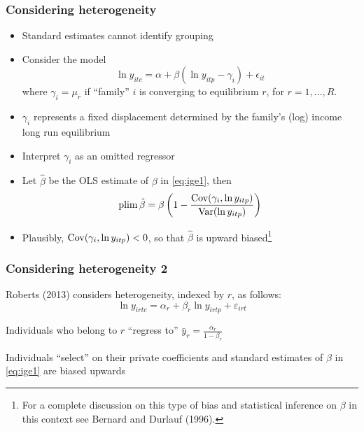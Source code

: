 \begin{frame}
	\frametitle{Considering heterogeneity}
		\begin{itemize}
			\item Standard estimates cannot identify grouping
			\item Consider the model
				\begin{equation}
				\ln y_{itc} = \alpha + \beta ( \ln y_{itp} - \gamma_{i}) + \epsilon_{it}				
				\end{equation}
where $\gamma_{i} = \mu_{r}$ if ``family'' $i$ is converging to equilibrium $r$, for $r = 1, \ldots, R$.
			\item $\gamma_{i}$ represents a fixed displacement determined by the family's (log) income long run equilibrium
			\item Interpret $\gamma_{i}$	as an omitted regressor
			\item Let $\hat{\beta}$ be the OLS estimate of $\beta$ in \eqref{eq:ige1}, then
			\begin{equation}
				\operatorname{plim} \hat{\beta} = \beta \left( 1 - \frac{\operatorname{Cov}(\gamma_{i}, \ln y_{itp} ) }{ \operatorname{Var} (\ln y_{itp})} \right)
			\end{equation}						
			\item Plausibly, $\operatorname{Cov}(\gamma_{i}, \ln y_{itp} )  < 0$, so that $\hat{\beta}$ is upward biased\footnote{For a complete discussion on this type of bias and statistical inference on $\beta$ in this context see Bernard and Durlauf (1996).}
		\end{itemize}
\end{frame}

\begin{frame}
	\frametitle{Considering heterogeneity 2}
	\begin{wideitemize}
	\item Roberts (2013) considers heterogeneity, indexed by $r$, as follows:
	\begin{equation}
		\ln y_{irtc} = \alpha_{r} + \beta_{r} \ln y_{irtp} + \varepsilon_{irt} \label{eq:ige2}
	\end{equation}		
	\item Individuals who belong to $r$ ``regress to'' $\bar{y}_{r} = \frac{\alpha_{r}}{1 - \beta_{r}}$
	\item Individuals ``select'' on their private coefficients and standard estimates of $\beta$ in \eqref{eq:ige1} are biased upwards
	\end{wideitemize}
\end{frame}

